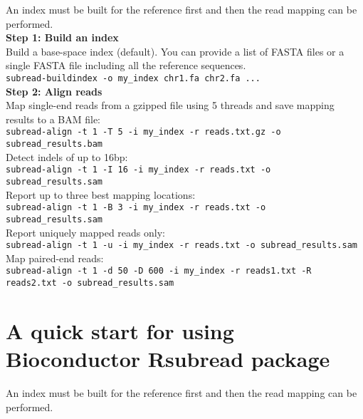 \documentclass[12pt]{report}
\newcommand{\code}[1]{{\small\texttt{#1}}}
\newcommand{\Rsubread}{\textsf{Rsubread}}
\begin{document}
An index must be built for the reference first and then the read mapping can be performed.\\

{\noindent\bf Step 1: Build an index}\\

\noindent Build a base-space index (default). You can provide a list of FASTA files or a single FASTA file including all the reference sequences.\\

\code{subread-buildindex -o my\_index chr1.fa chr2.fa ...}\\

{\noindent\bf Step 2: Align reads}\\

\noindent Map single-end reads from a gzipped file using 5 threads and save mapping results to a BAM file:\\
\code{subread-align -t 1 -T 5 -i my\_index -r reads.txt.gz -o subread\_results.bam}\\

\noindent Detect indels of up to 16bp:\\
\code{subread-align -t 1 -I 16 -i my\_index -r reads.txt -o subread\_results.sam}\\

\noindent Report up to three best mapping locations:\\
\code{subread-align -t 1 -B 3 -i my\_index -r reads.txt -o subread\_results.sam}\\

\noindent Report uniquely mapped reads only:\\
\code{subread-align -t 1 -u -i my\_index -r reads.txt -o subread\_results.sam}\\

\noindent Map paired-end reads:\\
\code{subread-align -t 1 -d 50 -D 600 -i my\_index -r reads1.txt -R reads2.txt \newline -o subread\_results.sam}\\


\section{A quick start for using Bioconductor {\Rsubread} package}

An index must be built for the reference first and then the read mapping can be performed.\\
\end{document}
